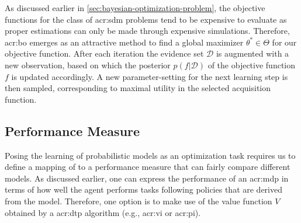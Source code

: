 As discussed earlier in  \autoref{sec:bayesian-optimization-problem}, the objective functions for the class of \acrshort{acr:sdm} problems tend to be expensive to evaluate as proper estimations can only be made through expensive simulations.
Therefore, \acrlong{acr:bo} emerges as an attractive method to find a global maximizer $\theta^\ast \in \Theta$ for our objective function.
After each iteration the evidence set $\mathcal{D}$ is augmented with a new observation, based on which the posterior $p(f\vert \mathcal{D})$ of the objective function $f$ is updated accordingly.
A new parameter-setting for the next learning step is then sampled, corresponding to maximal utility in the selected acquisition function.


\subsection{Performance Measure}

Posing the learning of probabilistic models as an optimization task requires us to define a mapping of  to a performance measure that can fairly compare different models.
As discussed earlier, one can express the performance of an \acrshort{acr:mdp} in terms of how well the agent performs tasks following policies that are derived from the model.
Therefore, one option is to make use of the value function $V$ obtained by a \acrshort{acr:dtp} algorithm (e.g., \acrshort{acr:vi} or \acrshort{acr:pi}).

